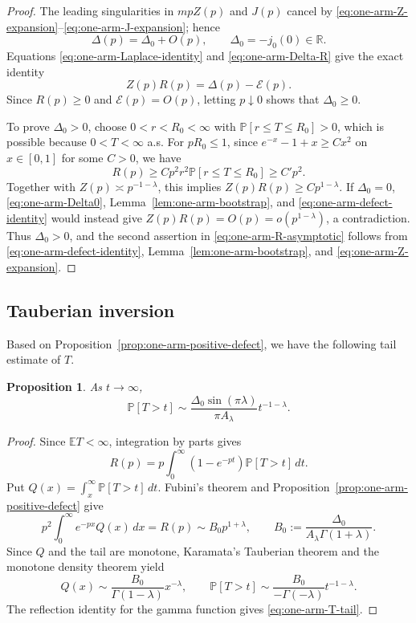 \documentclass[11pt]{article}
\numberwithin{equation}{section}
\newcommand{\R}{\mathbb{R}}
\newcommand{\E}{\mathbb{E}}
\newcommand{\1}{\mathbf{1}}
\newtheorem{proposition}[theorem]{Proposition}
\newcommand{\Prob}{\mathbb P}
\begin{document}
\begin{proof}
The leading singularities in \(mpZ(p)\) and \(J(p)\) cancel by
\eqref{eq:one-arm-Z-expansion}--\eqref{eq:one-arm-J-expansion}; hence
\begin{equation}\label{eq:one-arm-Delta0}
 \Delta(p)=\Delta_0+O(p),\qquad \Delta_0=-j_0(0)\in\R.
\end{equation}
Equations \eqref{eq:one-arm-Laplace-identity} and
\eqref{eq:one-arm-Delta-R} give the exact identity
\begin{equation}\label{eq:one-arm-defect-identity}
 Z(p)R(p)=\Delta(p)-\mathcal E(p).
\end{equation}
Since \(R(p)\ge0\) and \(\mathcal E(p)=O(p)\), letting \(p\downarrow0\)
shows that \(\Delta_0\ge0\).

To prove $\Delta_0>0$, choose \(0<r<R_0<\infty\) with
\(\Prob[r\le T\le R_0]>0\), which is possible because
\(0<T<\infty\) a.s.  For \(pR_0\le1\), since $e^{-x}-1+x\ge Cx^2$ on $x\in[0,1]$ for some $C>0$, we have 
\[
 R(p)\ge C p^2r^2\Prob[r\le T\le R_0]\ge C'p^2.
\]
Together with \(Z(p)\asymp p^{-1-\lambda}\), this implies
\(Z(p)R(p)\ge Cp^{1-\lambda}\). If \(\Delta_0=0\),
\eqref{eq:one-arm-Delta0}, Lemma~\ref{lem:one-arm-bootstrap}, and
\eqref{eq:one-arm-defect-identity} would instead give
\(Z(p)R(p)=O(p)=o(p^{1-\lambda})\), a contradiction.  Thus
\(\Delta_0>0\), and the second assertion in
\eqref{eq:one-arm-R-asymptotic} follows from
\eqref{eq:one-arm-defect-identity}, Lemma~\ref{lem:one-arm-bootstrap}, and
\eqref{eq:one-arm-Z-expansion}.
\end{proof}

\subsection{Tauberian inversion}
Based on Proposition~\ref{prop:one-arm-positive-defect}, we have the following tail estimate of $T$.
\begin{proposition}
\label{prop:one-arm-T-tail}
As \(t\to\infty\),
\begin{equation}\label{eq:one-arm-T-tail}
 \Prob[T>t]\sim
 \frac{\Delta_0\sin(\pi\lambda)}{\pi A_\lambda}t^{-1-\lambda}.
\end{equation}
\end{proposition}

\begin{proof}
Since \(\E T<\infty\), integration by parts gives
\[
 R(p)=p\int_0^\infty(1-e^{-pt})\Prob[T>t]\,dt.
\]
Put \(Q(x)=\int_x^\infty\Prob[T>t]\,dt\).  Fubini's theorem and
Proposition~\ref{prop:one-arm-positive-defect} give
\[
 p^2\int_0^\infty e^{-px}Q(x)\,dx=R(p)
 \sim B_0p^{1+\lambda},\qquad
 B_0:=\frac{\Delta_0}{A_\lambda\Gamma(1+\lambda)}.
\]
Since \(Q\) and the tail are monotone, Karamata's Tauberian theorem and the
monotone density theorem \cite[Section~1.7]{reg-var-book} yield
\[
 Q(x)\sim\frac{B_0}{\Gamma(1-\lambda)}x^{-\lambda},
 \qquad
 \Prob[T>t]\sim\frac{B_0}{-\Gamma(-\lambda)}t^{-1-\lambda}.
\]
The reflection identity for the gamma function gives
\eqref{eq:one-arm-T-tail}.
\end{proof}
\end{document}

